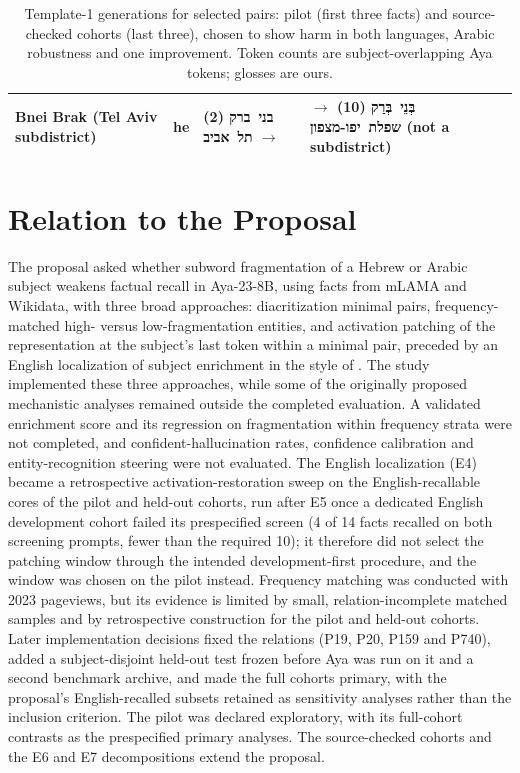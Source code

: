 \documentclass[11pt]{article}
\newcommand{\he}[1]{\mbox{\beginR\hebfont #1\endR}}
\newcommand{\cmark}{\textcolor{good}{\ding{51}}}
\newcommand{\xmark}{\textcolor{bad}{\ding{55}}}
\begin{document}
\begin{table}[t]
\begin{tabular}{@{}llll@{}}
Bnei Brak (Tel Aviv subdistrict) & he & \makecell[l]{\he{בני ברק} (2)\\[-1pt]$\rightarrow$ \he{תל אביב} \cmark} & \makecell[l]{\he{בְּנֵי בְּרַק} (10)\\[-1pt]$\rightarrow$ \he{שפלת יפו-מצפון} (not a subdistrict) \xmark}\\
\bottomrule
\end{tabular}
\caption{Template-1 generations for selected pairs: pilot (first three facts) and
source-checked cohorts (last three), chosen to show harm in both languages,
Arabic robustness and one improvement. Token counts are subject-overlapping Aya
tokens; glosses are ours.}
\label{tab:examples}
\end{table}

\section{Relation to the Proposal}
\label{app:scope}
The proposal asked whether subword fragmentation of a Hebrew or Arabic subject
weakens factual recall in Aya-23-8B, using facts from mLAMA and Wikidata, with
three broad approaches: diacritization minimal pairs, frequency-matched high-
versus low-fragmentation entities, and activation patching of the representation at the subject's last token
within a minimal pair, preceded by an English localization of
subject enrichment in the style of \citet{geva-etal-2023-dissecting}. The study
implemented these three approaches, while some of the originally proposed
mechanistic analyses remained outside the completed evaluation. A validated
enrichment score and its regression on fragmentation within frequency strata were
not completed, and confident-hallucination rates, confidence calibration and
entity-recognition steering \citep{ferrando-etal-2025-know} were not evaluated.
The English localization (E4) became a retrospective activation-restoration sweep
on the English-recallable cores of the pilot and held-out cohorts, run after E5
once a dedicated English development cohort failed its prespecified screen (4 of
14 facts recalled on both screening prompts, fewer than the required 10); it
therefore did not select the patching window through the intended
development-first procedure, and the window was chosen on the pilot instead.
Frequency matching was conducted with 2023 pageviews, but its evidence is limited
by small, relation-incomplete matched samples and by retrospective construction
for the pilot and held-out cohorts. Later implementation decisions fixed the
relations (P19, P20, P159 and P740), added a subject-disjoint held-out test frozen
before Aya was run on it and a second benchmark archive, and made the full cohorts
primary, with the proposal's English-recalled subsets retained as sensitivity
analyses rather than the inclusion criterion. The pilot was declared exploratory,
with its full-cohort contrasts as the prespecified primary analyses. The
source-checked cohorts and the E6 and E7 decompositions extend the proposal.
\end{document}
